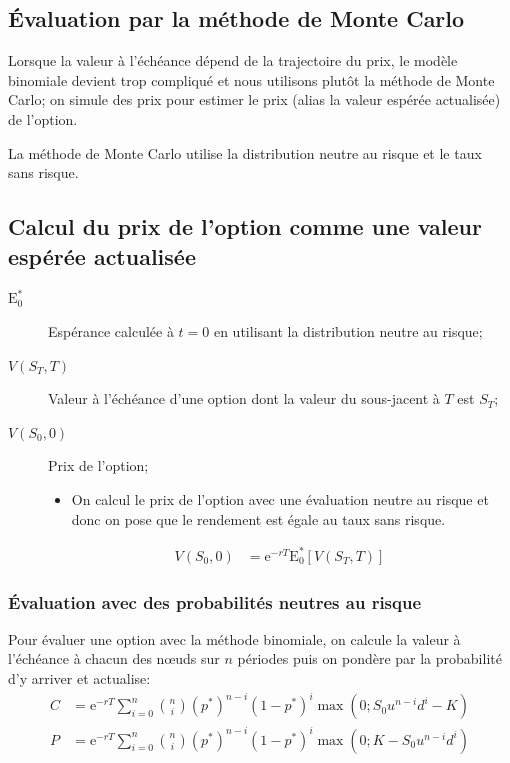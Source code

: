 \documentclass[10pt, french]{article}
\begin{document}
\begin{multicols*}{2}
\pagebreak
\section{Évaluation par la méthode de Monte Carlo}
Lorsque la valeur à l'échéance dépend de la trajectoire du prix, le modèle binomiale devient trop compliqué et nous utilisons plutôt la méthode de Monte Carlo; on simule des prix pour estimer le prix (alias la valeur espérée actualisée) de l'option.

La méthode de Monte Carlo utilise la distribution neutre au risque et le taux sans risque.

\subsection{Calcul du prix de l'option comme une valeur espérée actualisée}
\begin{distributions}[Notation]
\begin{description}
	\item[$\text{E}_{0}^{*}$]	Espérance calculée à $t	=	0$ en utilisant la distribution neutre au risque;
	\item[$V(S_{T}, T)$]	Valeur à l'échéance d'une option dont la valeur du sous-jacent à $T$ est $S_{T}$;
	\item[$V(S_{0}, 0)$]	Prix de l'option;
		\begin{itemize}[leftmargin = *]
		\item	On calcul le prix de l'option avec une évaluation neutre au risque et donc on pose que le rendement est égale au taux sans risque.
		\end{itemize}
		\begin{align*}
		V(S_{0}, 0)	
		&=	\textrm{e}^{-rT}\text{E}_{0}^{*}[V(S_{T}, T)]
		\end{align*}
\end{description}
\end{distributions}

\subsubsection*{Évaluation avec des probabilités neutres au risque}
Pour évaluer une option avec la méthode binomiale, on calcule la valeur à l'échéance à chacun des nœuds sur $n$ périodes puis on pondère par la probabilité d'y arriver et actualise:
\begin{align*}
	C
	&=	\textrm{e}^{-rT} \sum_{i	=	0}^{n} \binom{n}{i} (p^{*})^{n	-	i}(1	-	p^{*})^{i} \max(0;	S_{0}u^{n	-	i}d^{i}	-	K)	\\
	P
	&=	\textrm{e}^{-rT} \sum_{i	=	0}^{n} \binom{n}{i} (p^{*})^{n	-	i}(1	-	p^{*})^{i} \max(0;	K	-	S_{0}u^{n	-	i}d^{i})	
\end{align*}


\end{multicols*}
\end{document}
